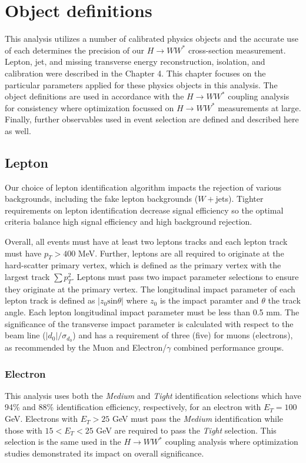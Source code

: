 \section{Object definitions}
This analysis utilizes a number of calibrated physics objects and the accurate use of each determines the precision of our $H\rightarrow WW^*$ cross-section measurement. Lepton, jet, and missing transverse energy reconstruction, isolation, and calibration were described in the Chapter 4. This chapter focuses on the particular parameters applied for these physics objects in this analysis. The object definitions are used in accordance with the $H\rightarrow WW^*$ coupling analysis for consistency where optimization focussed on $H \rightarrow WW^*$ measurements at large. Finally, further observables used in event selection are defined and described here as well. 

\subsection{Lepton}

Our choice of lepton identification algorithm impacts the rejection of various backgrounds, including the fake lepton backgrounds ($W+$jets). Tighter requirements on lepton identification decrease signal efficiency so the optimal criteria balance high signal efficiency and high background rejection.

Overall, all events must have at least two leptons tracks and each lepton track must have $p_T>400$ MeV. Further, leptons are all required to originate at the hard-scatter primary vertex, which is defined as the primary vertex with the largest track $\sum p_T^2$. Leptons must pass two impact parameter selections to ensure they originate at the primary vertex. The longitudinal impact parameter of each lepton track is defined as $|z_0\mathrm{sin}\theta|$ where $z_0$ is the impact paramter and $\theta$ the track angle. Each lepton longitudinal impact parameter must be less than 0.5 mm. The significance of the transverse impact parameter is calculated with respect to the beam line ($|d_0|/\sigma_{d_0}$) and has a requirement of three (five) for muons (electrons), as recommended by the Muon and Electron/$\gamma$ combined performance groups. 

\subsubsection{Electron}
This analysis uses both the \textit{Medium} and \textit{Tight} identification selections which have 94\% and 88\% identification efficiency, respectively, for an electron with $E_T=100$  GeV. Electrons with $E_T>25$ GeV must pass the \textit{Medium} identification while those with $15<E_T<25$ GeV are required to pass the \textit{Tight} selection. This selection is the same used in the $H\rightarrow WW^*$ coupling analysis where optimization studies demonstrated its impact on overall significance. 


